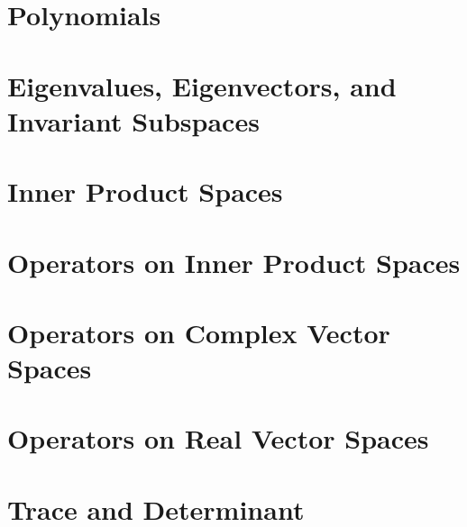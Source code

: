 \documentclass{article}
\begin{document}
\section{Polynomials}

\section{Eigenvalues, Eigenvectors, and Invariant Subspaces}

\section{Inner Product Spaces}

\section{Operators on Inner Product Spaces}

\section{Operators on Complex Vector Spaces}

\section{Operators on Real Vector Spaces}

\section{Trace and Determinant}
\end{document}
